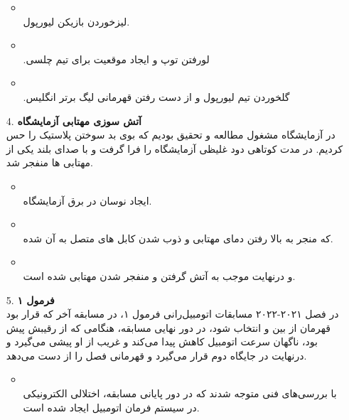 \begin{qsolve}[]
	\begin{enumerate}
		\item [ ]
		\begin{itemize}
			\item {}\\
			لیزخوردن بازیکن لیورپول.
			
			\item {}\\
			‫لو‬‫رفتن‬ ‫توپ‬ ‫و‬ ‫ایجاد‬ ‫موقعیت‬ ‫برای‬ ‫تیم‬ ‫چلسی‪.‬‬
			
			\item {}\\
			‫گل‫خوردن‬ ‫تیم‬ ‫لیورپول‬ ‫و‬ ‫از‬ ‫دست‬ ‫رفتن‬ ‫قهرمانی‬ ‫لیگ‬ ‫برتر‬ ‫انگلیس‪.‬‬
		\end{itemize}
		
		
		
		
		\item [4.]
		\textbf{آتش سوزی مهتابی آزمایشگاه}\\
		در آزمایشگاه مشغول مطالعه و تحقیق بودیم که بوی بد سوختن پلاستیک را حس کردیم. در مدت کوتاهی دود غلیظی آزمایشگاه را فرا گرفت و با صدای بلند یکی از مهتابی ها منفجر شد.
		
		\begin{itemize}
			\item {}\\
			ایجاد نوسان در برق آزمایشگاه.
			
			\item {}\\
			که منجر به بالا رفتن دمای مهتابی و ذوب شدن کابل های متصل به آن شده.
			
			\item {}\\
			و درنهایت موجب به آتش گرفتن و منفجر شدن مهتابی شده است.
		\end{itemize}
		
		
		
		\item [5.]
		\textbf{فرمول ۱}\\
		در فصل ۲۰۲۱-۲۰۲۲ مسابقات اتومبیل‌رانی فرمول ۱، در مسابقه آخر که قرار بود قهرمان از بین  و  انتخاب شود، در دور نهایی مسابقه، هنگامی که  از رقیبش پیش بود، ناگهان سرعت اتومبیل کاهش پیدا می‌کند و غریب از او پیشی می‌گیرد و درنهایت  در جایگاه دوم قرار می‌گیرد و قهرمانی فصل را از دست می‌دهد.
		
		\begin{itemize}
			\item {}\\
			با بررسی‌های فنی متوجه شدند که در دور پایانی مسابقه، اختلالی الکترونیکی در سیستم فرمان اتومبیل  ایجاد شده است.
			

\end{itemize}
\end{enumerate}
\end{qsolve}
